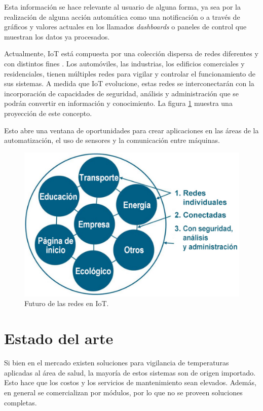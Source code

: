 Esta información se hace relevante al usuario de alguna forma, ya sea por la realización de alguna acción automática como una notificación o a través de gráficos y valores actuales en los llamados \textit{dashboards} o paneles de control que muestran los datos ya procesados.

Actualmente, IoT está compuesta por una colección dispersa de redes diferentes y con distintos fines \citep{cisco}. Los automóviles, las industrias, los edificios comerciales y residenciales, tienen múltiples redes para vigilar y controlar el funcionamiento de sus sistemas. A medida que IoT evolucione, estas redes se interconectarán con la incorporación de capacidades de seguridad, análisis y administración que se podrán convertir en información y conocimiento. La figura \ref{fig:iotcisco} muestra una proyección de este concepto.

Esto abre una ventana de oportunidades para crear aplicaciones en las áreas de la automatización, el uso de sensores y la comunicación entre máquinas. 
\vspace{1cm}
\begin{figure}[htbp]
	\centering
	\includegraphics[width=.7\textwidth]{./Figures/iotcisco.png}
	\caption{Futuro de las redes en IoT\protect\footnotemark.}
	\label{fig:iotcisco}
\end{figure}
\vspace{1cm}

\section{Estado del arte}
Si bien en el mercado existen soluciones para vigilancia de temperaturas aplicadas al área de salud, la mayoría de estos sistemas son de origen importado. Esto hace que los costos y los servicios de mantenimiento sean elevados. Además, en general se comercializan por módulos, por lo que no se proveen soluciones completas.

